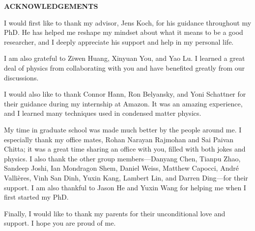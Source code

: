\clearpage
\begin{centering}
\textbf{ACKNOWLEDGEMENTS}\\
\vspace{\baselineskip}
\end{centering}
I would first like to thank my advisor, Jens Koch, for his guidance throughout my PhD. He has helped me reshape my mindset about what it means to be a good researcher, and I deeply appreciate his support and help in my personal life.

I am also grateful to Ziwen Huang, Xinyuan You, and Yao Lu. I learned a great deal of physics from collaborating with you and have benefited greatly from our discussions.

I would also like to thank Connor Hann, Ron Belyansky, and Yoni Schattner for their guidance during my internship at Amazon. It was an amazing experience, and I learned many techniques used in condensed matter physics.

My time in graduate school was made much better by the people around me. I especially thank my office mates, Rohan Narayan Rajmohan and Sai Paivan Chitta; it was a great time sharing an office with you, filled with both jokes and physics. I also thank the other group members---Danyang Chen, Tianpu Zhao, Sandeep Joshi, Ian Mondragon Shem, Daniel Weiss, Matthew Capocci, André Vallières, Vinh San Dinh, Yuxin Kang, Lambert Lin, and Darren Ding---for their support. I am also thankful to Jason He and Yuxin Wang for helping me when I first started my PhD.

Finally, I would like to thank my parents for their unconditional love and support. I hope you are proud of me.

\clearpage

